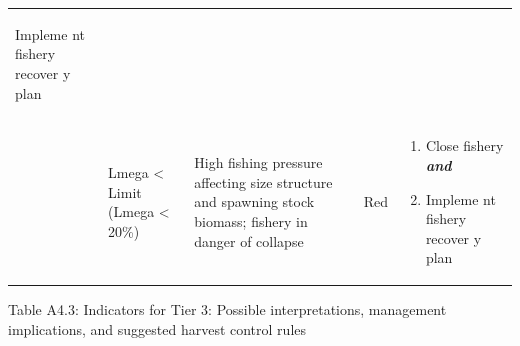 \documentclass[]{book}
\begin{document}
\begin{longtable}[]{@{}lllll@{}}
\begin{minipage}[t]{0.19\columnwidth}
\begin{enumerate}
  Impleme nt fishery recover y plan
\end{enumerate}\strut
\end{minipage}\tabularnewline
\begin{minipage}[t]{0.19\columnwidth}\raggedright\strut
\strut
\end{minipage} & \begin{minipage}[t]{0.19\columnwidth}\raggedright\strut
Lmega \textless{} Limit (Lmega \textless{} 20\%)\strut
\end{minipage} & \begin{minipage}[t]{0.19\columnwidth}\raggedright\strut
High fishing pressure affecting size structure and spawning stock
biomass; fishery in danger of collapse\strut
\end{minipage} & \begin{minipage}[t]{0.19\columnwidth}\raggedright\strut
Red\strut
\end{minipage} & \begin{minipage}[t]{0.19\columnwidth}\raggedright\strut
\begin{enumerate}
\def\labelenumi{\arabic{enumi}.}
\item
  Close fishery \textbf{\emph{and} }
\item
  Impleme nt fishery recover y plan
\end{enumerate}\strut
\end{minipage}\tabularnewline
\bottomrule
\end{longtable}

Table A4.3: Indicators for Tier 3: Possible interpretations, management
implications, and suggested harvest control rules
\end{document}
